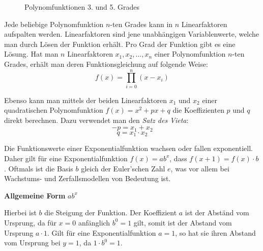 \pagebreak

\begin{figure}[t!]
\centering
\caption*{Polynomfunktionen 3. und 5. Grades}
\end{figure}


Jede beliebige Polynomfunktion $n$-ten Grades kann in $n$ Linearfaktoren aufspalten werden. Linearfaktoren sind jene unabh\"{a}ngigen Variablenwerte, welche man durch L\"{o}sen der Funktion erh\"{a}lt. Pro Grad der Funktion gibt es eine L\"{o}sung. Hat man $n$ Linearfaktoren $x_{1}, x_{2}, ..., x_{n}$ einer Polynomfunktion $n$-ten Grades, erh\"{a}lt man deren Funktionsgleichung auf folgende Weise: $$f(x) = \prod_{i = 0}^{n} (x - x_{i})$$

Ebenso kann man mittels der beiden Linearfaktoren $x_{1}$ und $x_{2}$ einer quadratischen Polynomfunktion $f(x) = x^2 + px + q$ die Koeffizienten $p$ und $q$ direkt berechnen. Dazu verwendet man den \emph{Satz des Vieta}: $$-p = x_{1} + x_{2}$$ $$q = x_{1} \cdot x_{2}$$


Die Funktionswerte einer Exponentialfunktion wachsen oder fallen exponentiell. Daher gilt f\"{u}r eine Exponentialfunktion $f(x) = ab^x$, dass $f(x + 1) = f(x) \cdot b$. Oftmals ist die Basis $b$ gleich der Euler'schen Zahl $e$, was vor allem bei Wachstums- und Zerfallsmodellen von Bedeutung ist.

\textbf{Allgemeine Form}  $ab^x$

Hierbei ist $b$ die Steigung der Funktion. Der Koeffizient $a$ ist der Abst\"{a}nd vom Ursprung, da f\"{u}r $x = 0$ anf\"{a}nglich $b^0 = 1$ gilt, somit ist der Abstand vom Ursprung $a \cdot 1$. Gilt f\"{u}r eine Exponentialfunktion $a = 1$, so hat sie ihren Abstand vom Ursprung bei $y =1$, da $1 \cdot b^0 = 1$.

